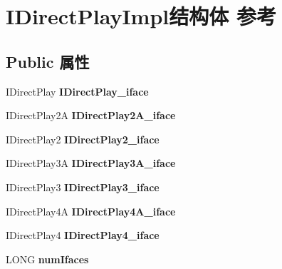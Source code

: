 \hypertarget{struct_i_direct_play_impl}{}\section{I\+Direct\+Play\+Impl结构体 参考}
\label{struct_i_direct_play_impl}
\subsection*{Public 属性}
\begin{DoxyCompactItemize}
\item 
\mbox{\label{struct_i_direct_play_impl_abac4b1a9064a949b6b716e86bf143d3e}} 
I\+Direct\+Play {\bfseries I\+Direct\+Play\+\_\+iface}
\item 
\mbox{\label{struct_i_direct_play_impl_a7179a7f8fa01480ace58e4acc65b1b9c}} 
I\+Direct\+Play2A {\bfseries I\+Direct\+Play2\+A\+\_\+iface}
\item 
\mbox{\label{struct_i_direct_play_impl_a7c361a34499b51f39b06a70598771cdc}} 
I\+Direct\+Play2 {\bfseries I\+Direct\+Play2\+\_\+iface}
\item 
\mbox{\label{struct_i_direct_play_impl_af4bd99173194307c12c7b4f9d4ba307f}} 
I\+Direct\+Play3A {\bfseries I\+Direct\+Play3\+A\+\_\+iface}
\item 
\mbox{\label{struct_i_direct_play_impl_af2b2519a2ff8f01ac685f8290474757c}} 
I\+Direct\+Play3 {\bfseries I\+Direct\+Play3\+\_\+iface}
\item 
\mbox{\label{struct_i_direct_play_impl_ae02502bfdf034e3637467b63c24dfe83}} 
I\+Direct\+Play4A {\bfseries I\+Direct\+Play4\+A\+\_\+iface}
\item 
\mbox{\label{struct_i_direct_play_impl_aca23b975cee59b3fe458315b0c97d07e}} 
I\+Direct\+Play4 {\bfseries I\+Direct\+Play4\+\_\+iface}
\item 
\mbox{\label{struct_i_direct_play_impl_af5baa2d09a2ae51cbd148c6f7d109f2b}} 
L\+O\+NG {\bfseries num\+Ifaces}
\item 

\end{DoxyCompactItemize}
